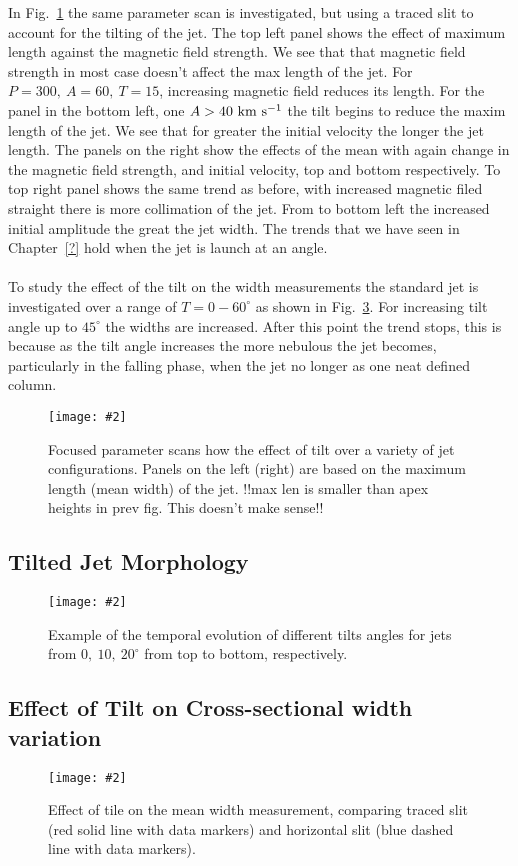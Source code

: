 \documentclass[12pt]{ociamthesis}
\newcommand{\mfig}[4]{
  \begin{figure}
  \begin{center}
  \texttt{[image: \#2]}
  \caption{#3}
  \label{#4}
  \end{center}
  \end{figure}}
\newcommand{\kms}{~\rm{km ~s^{-1}}}
\newcommand{\np}{\\ \\}
\begin{document}
In Fig.~\ref{p_scan_t_len} the same parameter scan is investigated, but using a traced slit to account for the tilting of the jet. The top left panel shows the effect of maximum length against the magnetic field strength. We see that that magnetic field strength in most case doesn’t affect the max length of the jet. For $P=300,~A=60,~T=15$, increasing magnetic field reduces its length. For the panel in the bottom left, one $A>40 \kms$  the tilt begins to reduce the maxim length of the jet. We see that for greater the initial velocity the longer the jet length. The panels on the right show the effects of the mean with again change in the magnetic field strength, and initial velocity, top and bottom respectively. To top right panel shows the same trend as before, with increased magnetic filed straight there is more collimation of the jet. From to bottom left the increased initial amplitude the great the jet width. The trends that we have seen in Chapter~\ref{?} hold when the jet is launch at an angle.  \np
%
To study the effect of the tilt on the width measurements the standard jet is investigated over a range of $T=0-60^{\circ}$ as shown in Fig.~\ref{width_measure}. For increasing tilt angle up to $45^{\circ}$ the widths are increased. After this point the trend stops, this is because as the tilt angle increases the more nebulous the jet becomes, particularly in the falling phase, when the jet no longer as one neat defined column.        
\mfig{1}{figures/traced_slit_pscan.png}{Focused parameter scans how the effect of tilt over a variety of jet configurations. Panels on the left (right) are based on the maximum length (mean width) of the jet. {\color{green}!!max len is smaller than apex heights in prev fig. This doesn’t make sense!!}}{p_scan_t_len}
\subsection{Tilted Jet Morphology}
\label{subsec:steady}
\mfig{1}{figures/tj_den_plot_1.png}{Example of the temporal evolution of different tilts angles for jets from $0,~10,~20^{\circ}$ from top to bottom, respectively.}{tj_morph}

\subsection{Effect of Tilt on Cross-sectional width variation}
\label{subsec:oscillating}
\mfig{1}{figures/mean_w_vs_tilt.png}{Effect of tile on the mean width measurement, comparing traced slit (red solid line with data markers) and horizontal slit (blue dashed line with data markers).}{width_measure}
\end{document}
